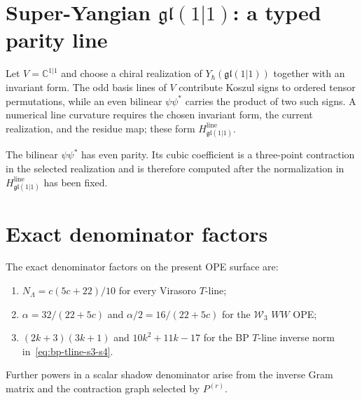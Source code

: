 \section{Super-Yangian $\mathfrak{gl}(1|1)$: a typed parity line}
\label{sec:sl11-fermionic-line-sign}

\begin{theorem}
\label{thm:super-yangian-fermionic-line-sign}
Let $V=\mathbb C^{1|1}$ and choose a chiral realization of
$Y_\hbar(\mathfrak{gl}(1|1))$ together with an invariant form.  The
odd basis lines of $V$ contribute Koszul signs to ordered tensor
permutations, while an even bilinear $\psi\psi^*$ carries the product
of two such signs.  A numerical line curvature requires the chosen
invariant form, the current realization, and the residue map; these
form $H_{\mathfrak{gl}(1|1)}^{\mathrm{line}}$.
\end{theorem}

\begin{remark}
\label{rem:fermionic-bilinear-positive-s3}
The bilinear $\psi\psi^*$ has even parity.  Its cubic coefficient is a
three-point contraction in the selected realization and is therefore
computed after the normalization in
$H_{\mathfrak{gl}(1|1)}^{\mathrm{line}}$ has been fixed.
\end{remark}

\section{Exact denominator factors}
\label{sec:denominator-pattern-hypothesis}

\begin{theorem}
\label{thm:denominator-factorization-pattern}
The exact denominator factors on the present OPE surface are:
\begin{enumerate}[label=\textup{(\roman*)}]
\item $N_\Lambda=c(5c+22)/10$ for every Virasoro $T$-line;
\item $\alpha=32/(22+5c)$ and $\alpha/2=16/(22+5c)$ for the
 $\mathcal W_3$ $WW$ OPE;
\item $(2k+3)(3k+1)$ and $10k^2+11k-17$ for the BP $T$-line inverse
 norm in~\eqref{eq:bp-tline-s3-s4}.
\end{enumerate}
Further powers in a scalar shadow denominator arise from the inverse
Gram matrix and the contraction graph selected by $P^{(r)}$.
\end{theorem}

